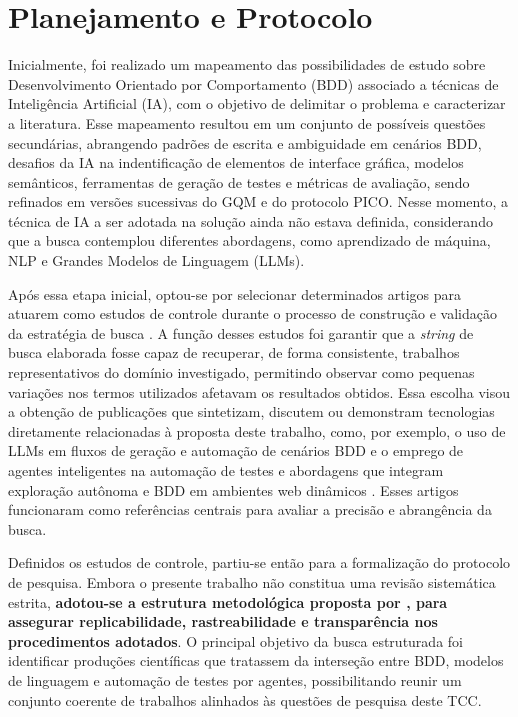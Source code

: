 \section{Planejamento e Protocolo}
\label{sec:rsl-protocolo}

Inicialmente, foi realizado um mapeamento das possibilidades de estudo sobre Desenvolvimento Orientado por Comportamento (BDD) associado a técnicas de Inteligência Artificial (IA), com o objetivo de delimitar o problema e caracterizar a literatura. Esse mapeamento resultou em um conjunto de possíveis questões secundárias, abrangendo padrões de escrita e ambiguidade em cenários BDD, desafios da IA na indentificação de elementos de interface gráfica, modelos semânticos, ferramentas de geração de testes e métricas de avaliação, sendo refinados em versões sucessivas do GQM e do protocolo PICO. Nesse momento, a técnica de IA a ser adotada na solução ainda não estava definida, considerando que a busca contemplou diferentes abordagens, como aprendizado de máquina, NLP e Grandes Modelos de Linguagem (LLMs).

Após essa etapa inicial, optou-se por selecionar determinados artigos para atuarem como estudos de controle durante o processo de construção e validação da estratégia de busca \cite{Alinezhadtilaki2025,Wang2022,Paduraru2025}. A função desses estudos foi garantir que a \textit{string} de busca elaborada fosse capaz de recuperar, de forma consistente, trabalhos representativos do domínio investigado, permitindo observar como pequenas variações nos termos utilizados afetavam os resultados obtidos. Essa escolha visou a obtenção de publicações que sintetizam, discutem ou demonstram tecnologias diretamente relacionadas à proposta deste trabalho, como, por exemplo, o uso de LLMs em fluxos de geração e automação de cenários BDD e o emprego de agentes inteligentes na automação de testes \cite{Paduraru2025} e abordagens que integram exploração autônoma e BDD em ambientes web dinâmicos \cite{Mughal2025}. Esses artigos funcionaram como referências centrais para avaliar a precisão e abrangência da busca.

Definidos os estudos de controle, partiu-se então para a formalização do protocolo de pesquisa. Embora o presente trabalho não constitua uma revisão sistemática estrita, \textbf{adotou-se a estrutura metodológica proposta por \cite{kitchenham2007guidelines}, para assegurar replicabilidade, rastreabilidade e transparência nos procedimentos adotados}. O principal objetivo da busca estruturada foi identificar produções científicas que tratassem da interseção entre BDD, modelos de linguagem e automação de testes por agentes, possibilitando reunir um conjunto coerente de trabalhos alinhados às questões de pesquisa deste TCC.

